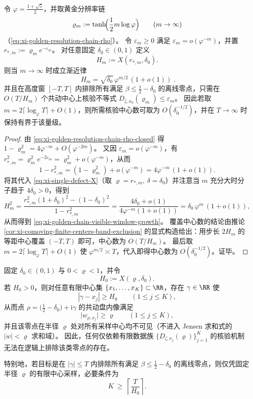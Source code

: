 \begin{theorem}[黄金分辨率链上的可见窗增长与覆盖复杂度的标度律]\label{thm:xi-golden-chain-visible-window-growth}
令 \(\varphi=\frac{1+\sqrt5}{2}\)，并取黄金分辨率链
\[
\varrho_m:=\tanh\!\Bigl(\frac12 m\log\varphi\Bigr)\qquad(m\to\infty)
\]
（\eqref{eq:xi-golden-resolution-chain-rho}）。
令 \(\varepsilon_m\ge 0\) 满足 \(\varepsilon_m=o(\varphi^{-m})\)，并置
\(
r_{\ast,m}:=\varrho_m e^{-\varepsilon_m}
\)。
对任意固定 \(\delta_0\in(0,1)\) 定义
\[
H_m:=X(r_{\ast,m},\delta_0).
\]
则当 \(m\to\infty\) 时成立渐近律
\begin{equation}\label{eq:xi-golden-chain-visible-window-growth}
\boxed{\;
H_m=\sqrt{\delta_0}\,\varphi^{m/2}\,(1+o(1))\; }.
\end{equation}
并且在高度窗 \([{-}T,T]\) 内排除所有满足 \(\beta\le\tfrac12-\delta_0\) 的离线零点，只需在 \(O(T/H_m)\) 个共动中心上核验不等式 \(D_{\zeta,x_0}(\varrho_m)\le\varepsilon_m\)。
因此若取 \(m=2\lceil\log_\varphi T\rceil+O(1)\)，则所需核验中心数可取为 \(O(\delta_0^{-1/2})\)，并在 \(T\to\infty\) 时保持有界于该量级。
\end{theorem}

\begin{proof}
由 \eqref{eq:xi-golden-resolution-chain-rho-closed} 得
\(
1-\varrho_m^2=4\varphi^{-m}+O(\varphi^{-2m})
\)。
又因 \(\varepsilon_m=o(\varphi^{-m})\)，有
\(
r_{\ast,m}^2=\varrho_m^2e^{-2\varepsilon_m}=\varrho_m^2+o(\varphi^{-m})
\)，从而
\[
1-r_{\ast,m}^2
=(1-\varrho_m^2)+o(\varphi^{-m})
=4\varphi^{-m}\,(1+o(1)).
\]
将其代入 \eqref{eq:xi-single-defect-X}（取 \(\varrho=r_{\ast,m},\ \delta=\delta_0\)）并注意当 \(m\) 充分大时分子趋于 \(4\delta_0>0\)，得到
\[
H_m^2
=\frac{r_{\ast,m}^2(1+\delta_0)^2-(1-\delta_0)^2}{1-r_{\ast,m}^2}
=\frac{4\delta_0+o(1)}{4\varphi^{-m}(1+o(1))}
=\delta_0\,\varphi^{m}\,(1+o(1)),
\]
从而得到 \eqref{eq:xi-golden-chain-visible-window-growth}。
覆盖中心数的结论由推论 \ref{cor:xi-comoving-finite-centers-band-exclusion} 的显式构造给出：用步长 \(2H_m\) 的等距中心覆盖 \((-T,T)\) 即可，中心数为 \(O(T/H_m)\)。
最后取 \(m=2\lceil\log_\varphi T\rceil+O(1)\) 使 \(\varphi^{m/2}\asymp T\)，代入即得中心数为 \(O(\delta_0^{-1/2})\)。证毕。
\end{proof}

\begin{proposition}\label{prop:xi-comoving-finite-centers-blindspot}
固定 \(\delta_0\in(0,1)\) 与 \(0<\varrho<1\)，并令
\[
H_0:=X(\varrho,\delta_0).
\]
若 \(H_0>0\)，则对任意有限中心集 \(\{x_1,\dots,x_K\}\subset\RR\)，存在 \(\gamma\in\RR\) 使
\[
|\gamma-x_j|\ge H_0\qquad(1\le j\le K),
\]
从而点 \(\rho=\bigl(\tfrac12-\delta_0\bigr)+\mathrm{i}\gamma\) 的共动盘内像满足
\[
\bigl|w_{\rho,x_j}\bigr|\ge \varrho\qquad(1\le j\le K),
\]
并且该零点在半径 \(\varrho\) 处对所有采样中心均不可见（不进入 Jensen 求和式的 \(|w|<\varrho\) 求和域）。
因此，任何仅依赖有限数据族 \(\{D_{\zeta,x_j}(\varrho)\}_{j=1}^{K}\) 的核验机制无法在逻辑上排除该类零点的存在。
\par
特别地，若目标是在 \(|\gamma|\le T\) 内排除所有满足 \(\beta\le\tfrac12-\delta_0\) 的离线零点，则仅凭固定半径 \(\varrho\) 的有限中心采样，必要条件为
\[
K\ \ge\ \left\lceil\frac{T}{H_0}\right\rceil.
\]
\end{proposition}

